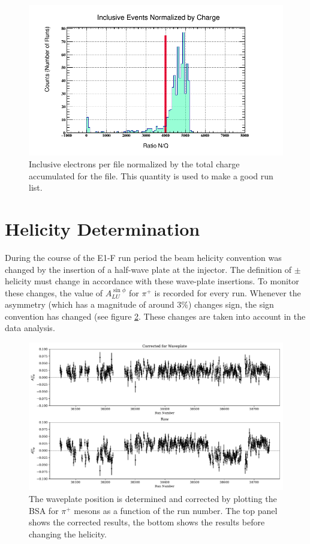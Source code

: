 \begin{figure}
	\label{fig:inclusive_rates}
	\begin{center}
		\includegraphics[width=14cm]{image/plots/basic-analysis/inclusive-rates.png}
		\caption{Inclusive electrons per file normalized by the total charge accumulated for the file.  This quantity is used to make a good run list.}
	\end{center}
\end{figure}

\section{Helicity Determination}
During the course of the E1-F run period the beam helicity convention was changed by the insertion of a half-wave plate at the injector.  The definition of $\pm$ helicity must change in accordance with these wave-plate insertions.  To monitor these changes, the value of $A_{LU}^{\sin\phi}$ for $\pi^+$ is recorded for every run.  Whenever the asymmetry (which has a magnitude of around $3\%$) changes sign, the sign convention has changed (see figure \ref{fig:bsa_waveplate}.  These changes are taken into account in the data analysis.   

\begin{figure}
	\centering
	\label{fig:bsa_waveplate}
	\includegraphics[width=12cm]{image/plots/basic-analysis/bsa-waveplate.pdf}
	\caption{The waveplate position is determined and corrected by plotting the BSA for $\pi^{+}$ mesons as a function of the run number.  The top panel shows the corrected results, the bottom shows the results before changing the helicity.}
\end{figure}

